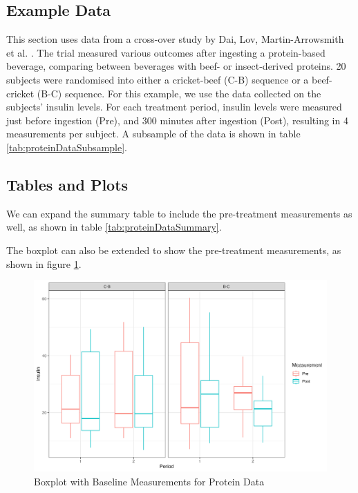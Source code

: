 \documentclass[12pt, TexShade, letterpaper]{report}
\begin{document}
\subsection{Example Data}
This section uses data from a cross-over study by Dai, Lov, Martin-Arrowsmith et al. \cite{dai2022insect}. The trial measured various outcomes after ingesting a protein-based beverage, comparing between beverages with beef- or insect-derived proteins. 20 subjects were randomised into either a cricket-beef (C-B) sequence or a beef-cricket (B-C) sequence. For this example, we use the data collected on the subjects' insulin levels. For each treatment period, insulin levels were measured just before ingestion (Pre), and 300 minutes after ingestion (Post), resulting in 4 measurements per subject. A subsample of the data is shown in table \ref{tab:proteinDataSubsample}.


\FloatBarrier
\subsection{Tables and Plots}
We can expand the summary table to include the pre-treatment measurements as well, as shown in table \ref{tab:proteinDataSummary}.



The boxplot can also be extended to show the pre-treatment measurements, as shown in figure \ref{fig:proteinBoxplot}.

\begin{figure}[htb]
    \centering
    \includegraphics[width=\linewidth]{report/figures/ch3/proteinBoxplot.png}
    \caption{Boxplot with Baseline Measurements for Protein Data}
    \label{fig:proteinBoxplot}
\end{figure}
\end{document}
